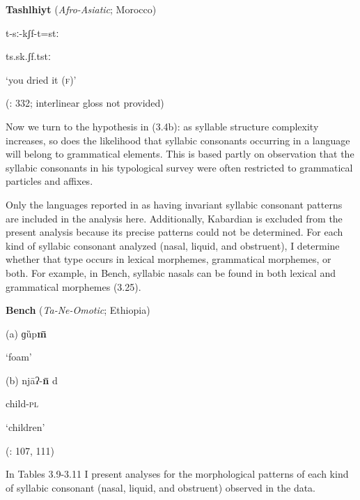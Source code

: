 \ea\label{ex:(3.24)}
  \textbf{Tashlhiyt} (\textit{Afro-Asiatic}; Morocco)



t{}-sː{}-kʃf{}-t=stː



ts.sk.ʃf.tstː



‘you dried it (\textsc{f})’



(\citealt{Ridouane2008}: 332; interlinear gloss not provided)

\z


  Now we turn to the hypothesis in (3.4b): as syllable structure complexity increases, so does the likelihood that syllabic consonants occurring in a language will belong to grammatical elements. This is based partly on  observation that the syllabic consonants in his typological survey were often restricted to grammatical particles and affixes.



  Only the languages reported in  as having invariant syllabic consonant patterns are included in the analysis here. Additionally, Kabardian is excluded from the present analysis because its precise patterns could not be determined. For each kind of syllabic consonant analyzed (nasal, liquid, and obstruent), I determine whether that type occurs in lexical morphemes, grammatical morphemes, or both. For example, in Bench, syllabic nasals can be found in both lexical and grammatical morphemes (3.25).



\ea\label{ex:(3.25)}
  \textbf{Bench} (\textit{Ta-Ne-Omotic}; Ethiopia)



(a)   ɡȕp\textbf{m\={} }



‘foam’



(b)   njāʔ{}-\textbf{n\={} }d



child-\textsc{pl}



‘children’



(\citealt{Rapold2006}: 107, 111)

\z


  In Tables 3.9-3.11 I present analyses for the morphological patterns of each kind of syllabic consonant (nasal, liquid, and obstruent) observed in the data.






